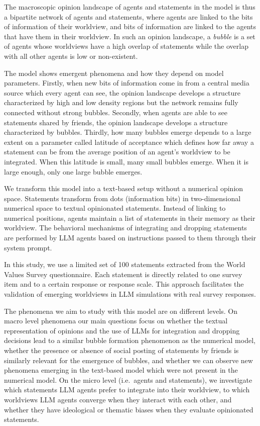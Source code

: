 \documentclass[]{ceurart}
\begin{document}
The macroscopic opinion landscape of agents and statements in the model
is thus a bipartite network of agents and statements, where agents are
linked to the bits of information of their worldview, and bits of
information are linked to the agents that have them in their worldview.
In such an opinion landscape, a \emph{bubble} is a set of agents whose
worldviews have a high overlap of statements while the overlap with all
other agents is low or non-existent.

The model shows emergent phenomena and how they depend on model
parameters. Firstly, when new bits of information come in from a central
media source which every agent can see, the opinion landscape develops a
structure characterized by high and low density regions but the network
remains fully connected without strong bubbles. Secondly, when agents
are able to see statements shared by friends, the opinion landscape
develops a structure characterized by bubbles. Thirdly, how many bubbles
emerge depends to a large extent on a parameter called latitude of
acceptance which defines how far away a statement can be from the
average position of an agent's worldview to be integrated. When this
latitude is small, many small bubbles emerge. When it is large enough,
only one large bubble emerges.

We transform this model into a text-based setup without a numerical
opinion space. Statements transform from dots (information bits) in
two-dimensional numerical space to textual opinionated statements.
Instead of linking to numerical positions, agents maintain a list of
statements in their memory as their worldview. The behavioral mechanisms
of integrating and dropping statements are performed by LLM agents based
on instructions passed to them through their system prompt.

In this study, we use a limited set of 100 statements extracted from the
World Values Survey questionnaire. Each statement is directly related to
one survey item and to a certain response or response scale. This
approach facilitates the validation of emerging worldviews in LLM
simulations with real survey responses.

The phenomena we aim to study with this model are on different levels.
On macro level phenomena our main questions focus on whether the textual
representation of opinions and the use of LLMs for integration and
dropping decisions lead to a similar bubble formation phenomenon as the
numerical model, whether the presence or absence of social posting of
statements by friends is similarly relevant for the emergence of
bubbles, and whether we can observe new phenomena emerging in the
text-based model which were not present in the numerical model. On the
micro level (i.e.~agents and statements), we investigate which
statements LLM agents prefer to integrate into their worldview, to which
worldviews LLM agents converge when they interact with each other, and
whether they have ideological or thematic biases when they evaluate
opinionated statements.
\end{document}
